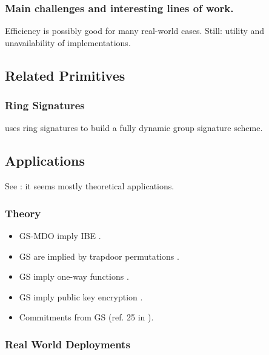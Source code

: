 \subsubsection{Main challenges and interesting lines of work.}

Efficiency is possibly good for many real-world cases. Still: utility
and unavailability of implementations.


\subsection{Related Primitives}

\subsubsection{Ring Signatures}
\label{sssec:rs}

\cite{rst06}

\cite{bcc+15} uses ring signatures to build a fully dynamic group signature
scheme.

\subsection{Applications}
\label{ssec:gsapplication}

See \cite[Section 1.2.3]{bsi12}: it seems mostly theoretical applications.

\subsubsection{Theory}
\label{sssec:gstheoryapp}

\begin{itemize}
\item GS-MDO imply IBE \cite{ehk+19}.
\item GS are implied by trapdoor permutations \cite{bmw03}.
\item GS imply one-way functions \cite{romp90}.
\item GS imply public key encryption \cite{aw04}.
\item Commitments from GS (ref. 25 in \cite{bfg+11}).
\end{itemize}

\subsubsection{Real World Deployments}
\label{sssec:gsrwdeploy}

